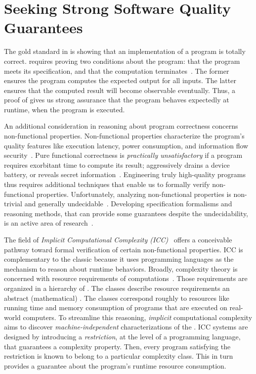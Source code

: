 \section{Seeking Strong Software Quality Guarantees}
\label{sec:aicc-intro}

The gold standard in  is showing that an implementation
of a program is {totally correct}. 
requires proving two conditions about the program: that the program meets its
specification, and that the computation
terminates~\cite{leino2023}. The former ensures the program computes the
expected output for all inputs. The latter ensures that the computed result will
become observable {eventually}. Thus, a proof of  gives us
strong assurance that the program behaves expectedly at runtime, \ie when the
program is executed.

An additional consideration in reasoning about program correctness concerns
{non-functional} properties. Non-functional
properties characterize the program's quality features like execution latency,
power consumption, and information flow security~\cite{terbeek2018}. Pure
functional correctness is \emph{practically unsatisfactory} if a program
requires exorbitant time to compute its result; aggressively drains a device
battery, or reveals secret information~\cite{heraud2011,aubert20222}.
Engineering truly high-quality programs thus requires additional techniques that
enable us to formally verify non-functional properties. Unfortunately, analyzing
non-functional properties is non-trivial and generally
undecidable~\cite{rice1953}. Developing specification
formalisms and reasoning methods, that can provide some guarantees despite the
undecidability, is an active area of research~\cite{etaps2025}.

The field of \emph{Implicit Computational Complexity (ICC)}~\cite{dallago2011}
offers a conceivable pathway toward formal verification of certain
non-functional properties. ICC is complementary to the classic  because it uses programming languages as the {mechanism} to reason about
runtime behaviors. Broadly, complexity theory is concerned with resource
requirements of computations~\cite{goldreich2008}. Those requirements are
organized in a hierarchy of . The classes describe
resource requirements \wrt an abstract (mathematical) . The
classes correspond roughly to resources like running time and memory consumption
of programs that are executed on real-world computers. To streamline this
reasoning, \emph{implicit} computational complexity aims to discover
\emph{machine-independent} characterizations of the .
ICC systems are designed by introducing a \emph{restriction}, at the level of a
programming language, that guarantees a complexity property. Then, every program
satisfying the restriction is known to belong to a particular complexity class.
This in turn provides a guarantee about the program's runtime resource
consumption.


